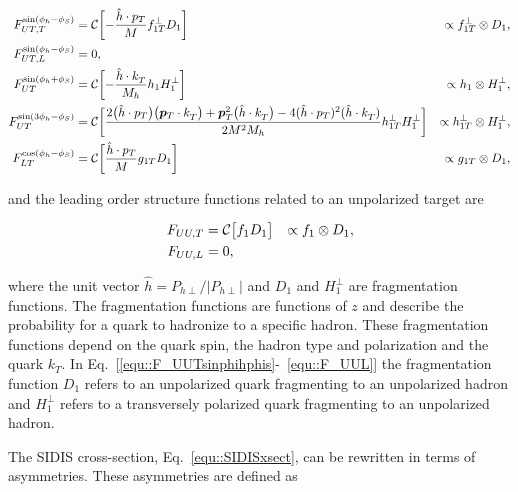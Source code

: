 \begin{align}
  \label{equ::F_UUTsinphihphis}
  F_{UT ,T}^{\sin\left(\phi_h -\phi_S\right)} &=
  {\cal C}\biggl[-\frac{\hat{h} \cdot p_T}{M} f_{1T}^{\perp } D_1\biggr]
  &\propto f_{1T}^{\perp } \otimes D_1, \\
  F_{UT ,L}^{\sin\left(\phi_h -\phi_S\right)} &= 0,\\
  F_{UT}^{\sin(\phi_h +\phi_S)} &=
  {\cal C}\biggl[-\frac{\hat{h}\cdot k_T^{}}{M_h} h_{1} H_1^{\perp }\biggr]
  &\propto h_{1} \otimes H_1^{\perp },\\
  F_{UT}^{\sin(3\phi_h -\phi_S)} &=
  {\cal C}\biggl[ \frac{2 \bigl(\hat{h}\cdot
      p_T \bigr) \bigl( \bm{p}_T\cdot k_T^{} \bigr) +\bm{p}_T^2
      \bigl(\hat{h}\cdot k_T^{} \bigr) -4 (\hat{h}\cdot p_T)^2 (\hat{h}\cdot
      k_T^{})}{2 M^2 M_h} h_{1T}^{\perp } H_1^{\perp }\biggr]
  &\propto h_{1T}^{\perp } \otimes H_1^{\perp },\\
  \label{equ::F_LTcosphihphis}
  F_{LT}^{\cos(\phi_h -\phi_S)}
  &={\cal C}\biggl[ \frac{\hat{h} \cdot p_T}{M} g_{1T}
    D_1 \biggr]
  &\propto g_{1T} \otimes D_1, 
\end{align}

\noindent
and the leading order structure functions related to an unpolarized target are

\begin{align}
  F_{UU ,T} &= {\cal C}\bigl[ f_1 D_1 \bigr] &\propto f_1 \otimes D_1, \\
  \label{equ::F_UUL}
  F_{UU ,L} &= 0,
\end{align}

\noindent
where the unit vector $\hat{h}=P_{h \perp}/|P_{h\perp}|$ and $D_1$ and
$H_1^{\perp}$ are fragmentation functions.  The fragmentation functions are
functions of $z$ and describe the probability for a quark to hadronize to a
specific hadron.  These fragmentation functions depend on the quark spin, the
hadron type and polarization and the quark $k_T$.  In
Eq.~[\ref{equ::F_UUTsinphihphis}-~\ref{equ::F_UUL}] the fragmentation
function $D_1$ refers to an unpolarized quark fragmenting to an unpolarized
hadron and $H_1^{\perp}$ refers to a transversely polarized quark fragmenting to
an unpolarized hadron.

The SIDIS cross-section, Eq.~\ref{equ::SIDISxsect}, can be rewritten in terms of
asymmetries.  These asymmetries are defined as

